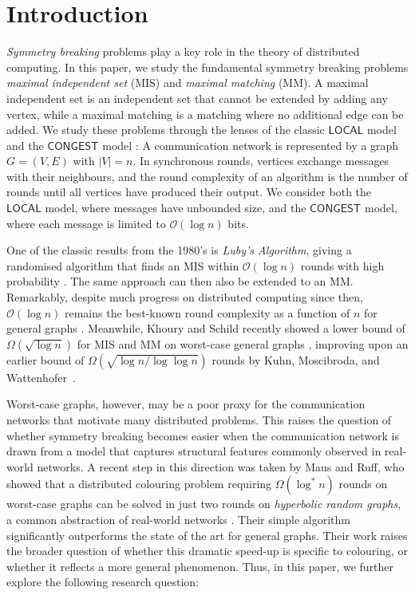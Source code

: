 \documentclass[letterpaper,11pt]{article}
\newcommand{\1}{\mathbb I}
\newcommand{\bigO}{\mathcal{O}}
\newcommand{\CONGEST}{\ensuremath{\mathsf{CONGEST}}\xspace}
\newcommand{\LOCAL}{\ensuremath{\mathsf{LOCAL}}\xspace}
\begin{document}
\newpage
\setcounter{page}{1}
\section{Introduction}
\emph{Symmetry breaking} problems play a key role in the theory of distributed computing. In this paper, we study the fundamental symmetry breaking problems \emph{maximal independent set} (MIS) and \emph{maximal matching} (MM). A maximal independent set is an independent set that cannot be extended by adding any vertex, while a maximal matching is a matching where no additional edge can be added. We study these problems through the lenses of the classic \LOCAL model and the \CONGEST model \cite{Linial-92,Peleg-00}: A communication network is represented by a graph $G=(V,E)$ with $|V|=n$. In synchronous rounds, vertices exchange messages with their neighbours, and the round complexity of an algorithm is the number of rounds until all vertices have produced their output. We consider both the \LOCAL model, where messages have unbounded size, and the \CONGEST model, where each message is limited to $\bigO(\log n)$ bits.

One of the classic results from the 1980's is \emph{Luby's Algorithm}, giving a randomised algorithm that finds an MIS within $\bigO(\log n)$ rounds with high probability \cite{luby86, Alon1986}. The same approach can then also be extended to an MM. Remarkably, despite much progress on distributed computing since then, $\bigO(\log n)$ remains the best-known round complexity as a function of $n$ for general graphs \cite{barenboimelkin_book, BEPS, ghaffari-soda-16, HarrisSS18, khoury2025round, ks-stoc-26, Barenboim2009, ghaffari2023faster, GG24, gghir-soda-23, ghaffariDISC19, lenzen2011mis, Mtivier2010, Schneider2010, RG20}. Meanwhile, Khoury and Schild recently showed a lower bound of $\Omega(\sqrt{\log n})$ for MIS and MM on worst-case general graphs \cite{khoury2025round}, improving upon an earlier bound of $\Omega(\sqrt{\log n/\log\log n})$ rounds by Kuhn, Moscibroda, and Wattenhofer~\cite{kmw-jacm-2016}. 

Worst-case graphs, however, may be a poor proxy for the communication networks that motivate many distributed problems. This raises the question of whether symmetry breaking becomes easier when the communication network is drawn from a model that captures structural features commonly observed in real-world networks. A recent step in this direction was taken by Maus and Ruff, who showed that a distributed colouring problem requiring $\Omega(\log^* n)$ rounds on worst-case graphs \cite{Linial-87, Naor91} can be solved in just two rounds on \emph{hyperbolic random graphs}, a common abstraction of real-world networks \cite{mr-soda-26}. Their simple algorithm significantly outperforms the state of the art for general graphs. 
 Their work raises the broader question of whether this dramatic speed-up is specific to colouring, or whether it reflects a more general phenomenon. %
Thus, in this paper, we further explore the following research question: 
\end{document}

